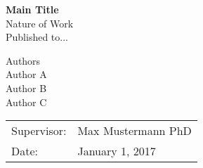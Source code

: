 
\begin{titlepage}
	\begin{center}
		\begin{onehalfspace}

		\Huge{$\;$\\\vspace{1cm}\textbf{Main Title}}\\
		\vspace{2cm}
		\Large{Nature of Work}\\

		\vspace{1cm}
		\Large {Published to...}

		\vspace{3cm}

		\large{Authors}\\
		\large{Author A}\\
		\large{Author B}\\
		\large{Author C}\\

		\vspace{2.5cm}

		\begin{tabular}{l l}
			Supervisor: & Max Mustermann PhD \\
			Date: & January 1, 2017\\
		\end{tabular}
		\end{onehalfspace}
	\end{center}
\end{titlepage}
